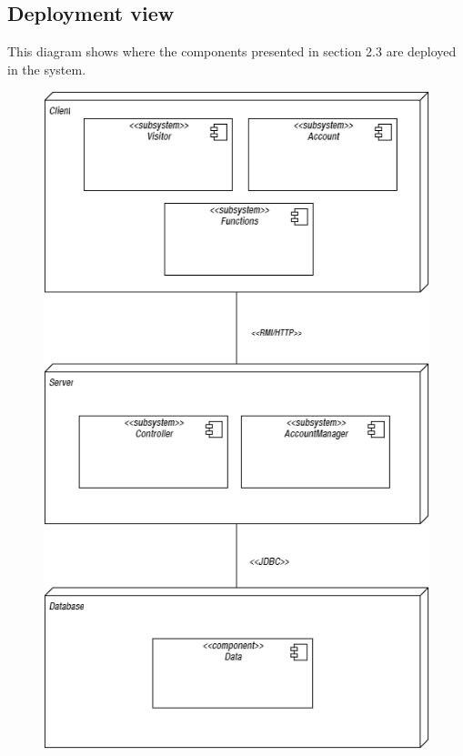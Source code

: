 		\subsection{Deployment view}
		This diagram shows where the components presented in section 2.3 are deployed in the system.
		\vspace{0,7cm}
		\begin{figure}[h]
			\centering
			\includegraphics[scale=0.56]{Diagrams/deploymentDiagram.png}
		\end{figure}
	\newpage
